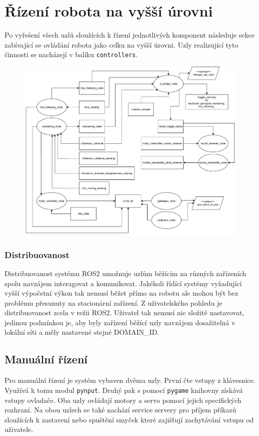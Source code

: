 \section{Řízení robota na vyšší úrovni}
Po vyřešení všech uzlů sloužících k řízení jednotlivých komponent následuje sekce zabívající se ovládání robota jako celku na vyšší úrovni. Uzly realizující tyto činnosti se nacházejí v balíku \verb|controllers|. 

\begin{figure}[h!]
	\centering
	\includegraphics[scale=0.5]{obrazky-figures/controller_nodes.pdf}
	\caption{}
	\label{}
\end{figure}

\subsubsection{Distribuovanost}
Distribuovanost systému ROS2 umožnuje uzlům běžícím na různých zařízeních spolu navzájem interagovat a komunikovat. Jakékoli řídící systémy vyžadující vyšší výpočetní výkon tak nemusí běžet přímo na robotu ale mohou být bez problému přesunuty na stacionární zařízení. Z uživatelského pohledu je distribuovanost zcela v režii ROS2. Uživatel tak nemusí nic složitě nastavovat, jedinou podmínkou je, aby byly zařízení běžící uzly navzájem dosažitelná v lokální síti a měly nastavené stejné DOMAIN\_ID.

\subsection*{Manuální řízení}
Pro manuální řízení je systém vybaven dvěma uzly. První čte vstupy z klávesnice. Využívá k tomu modul \verb|pynput|. Druhý pak s pomocí \verb|pygame| knihovny získává vstupy ovladače. Oba uzly ovládají motory a servo pomocí jejich specifických rozhraní. Na obou uzlech se také nachází service servery pro příjem příkazů sloužících k zastavení nebo spuštění smyček které zajišťují zachytávání vstupu od uživatele.

